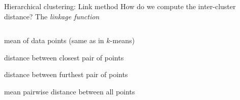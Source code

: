 \documentclass[pdf]{beamer}
\begin{document}
\begin{frame}{Hierarchical clustering: Link method}
How do we compute the inter-cluster distance? The \textit{linkage function}
\begin{columns}
\begin{description}[Complete:]\addtolength{\itemsep}{0.8\baselineskip}
	\item<2-> [Centroid:] mean of data points (same as in $k$-means)
	\item<3-> [Single:] distance between closest pair of points
	\item<4-> [Complete:] distance between furthest pair of points
	\item<5-> [Average:] mean pairwise distance between all points
\end{description}
\begin{center}
	\vfill
	\vfill
	\vfill
\end{center}
\end{columns}
\end{frame}
\end{document}
